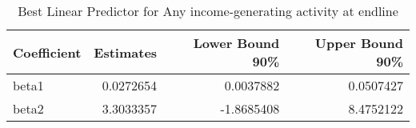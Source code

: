 \begin{table}

\caption{\label{tab:blpQany_iga}Best Linear Predictor for Any income-generating activity at endline}
\centering
\begin{tabular}[t]{lrrr}
\toprule
Coefficient & Estimates & Lower Bound 90\% & Upper Bound 90\%\\
\midrule
beta1 & 0.0272654 & 0.0037882 & 0.0507427\\
beta2 & 3.3033357 & -1.8685408 & 8.4752122\\
\bottomrule
\end{tabular}
\end{table}
